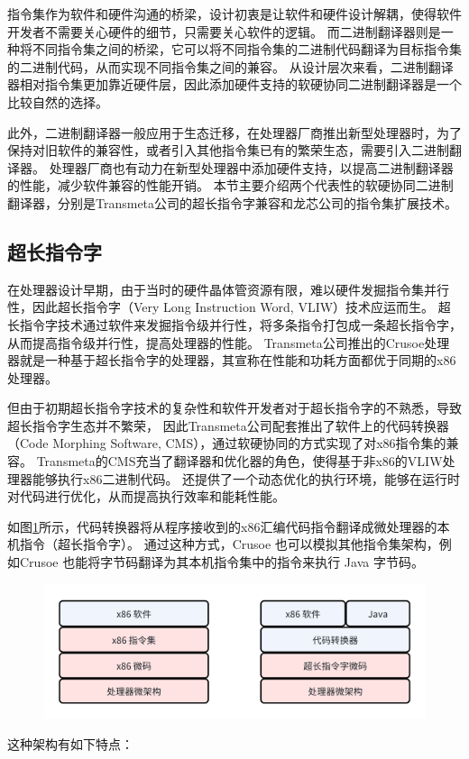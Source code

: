 指令集作为软件和硬件沟通的桥梁，设计初衷是让软件和硬件设计解耦，使得软件开发者不需要关心硬件的细节，只需要关心软件的逻辑。
而二进制翻译器则是一种将不同指令集之间的桥梁，它可以将不同指令集的二进制代码翻译为目标指令集的二进制代码，从而实现不同指令集之间的兼容。
从设计层次来看，二进制翻译器相对指令集更加靠近硬件层，因此添加硬件支持的软硬协同二进制翻译器是一个比较自然的选择。

此外，二进制翻译器一般应用于生态迁移，在处理器厂商推出新型处理器时，为了保持对旧软件的兼容性，或者引入其他指令集已有的繁荣生态，需要引入二进制翻译器。
处理器厂商也有动力在新型处理器中添加硬件支持，以提高二进制翻译器的性能，减少软件兼容的性能开销。
本节主要介绍两个代表性的软硬协同二进制翻译器，分别是Transmeta公司的超长指令字兼容和龙芯公司的指令集扩展技术。

\subsection{超长指令字}

在处理器设计早期，由于当时的硬件晶体管资源有限，难以硬件发掘指令集并行性，因此超长指令字（Very Long Instruction Word, VLIW）技术应运而生。
超长指令字技术通过软件来发掘指令级并行性，将多条指令打包成一条超长指令字，从而提高指令级并行性，提高处理器的性能。
Transmeta公司推出的Crusoe处理器就是一种基于超长指令字的处理器，其宣称在性能和功耗方面都优于同期的x86处理器\cite{dehnertTransmetaCodeMorphing2003}。

但由于初期超长指令字技术的复杂性和软件开发者对于超长指令字的不熟悉，导致超长指令字生态并不繁荣，
因此Transmeta公司配套推出了软件上的代码转换器（Code Morphing Software, CMS），通过软硬协同的方式实现了对x86指令集的兼容。
Transmeta的CMS充当了翻译器和优化器的角色，使得基于非x86的VLIW处理器能够执行x86二进制代码。
还提供了一个动态优化的执行环境，能够在运行时对代码进行优化，从而提高执行效率和能耗性能\cite{dehnertTransmetaCodeMorphing2003}。

如图\ref{img:transmeta_arch}所示，代码转换器将从程序接收到的x86汇编代码指令翻译成微处理器的本机指令（超长指令字）。
通过这种方式，Crusoe 也可以模拟其他指令集架构，例如Crusoe 也能将字节码翻译为其本机指令集中的指令来执行 Java 字节码。

\begin{figure}[!htbp]
    \centering
    \includegraphics[width=0.8\linewidth]{./feishuImage/transmeta_arch.png}
    \label{img:transmeta_arch}
  \end{figure}
这种架构有如下特点：

